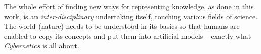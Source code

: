 The whole effort of finding new ways for representing knowledge, as done in
this work, is an \emph{inter-disciplinary} undertaking itself, touching various
fields of science. The world (nature) needs to be understood in its basics so
that humans are enabled to copy its concepts and put them into artificial
models -- exactly what \emph{Cybernetics} is all about.
